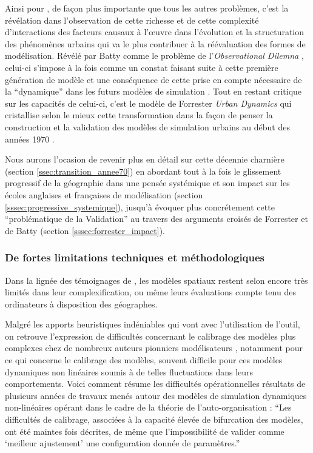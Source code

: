 Ainsi pour \textcite[11]{Batty1976}, de façon plus importante que tous les autres problèmes, c'est la révélation dans l'observation de cette richesse et de cette complexité d'interactions des facteurs causaux à l’œuvre dans l'évolution et la structuration des phénomènes urbains qui va le plus contribuer à la réévaluation des formes de modélisation. Révélé par Batty comme le problème de l'\textit{Observational Dilemna} \autocite[11,296]{Batty1976} , celui-ci s'impose à la fois comme un constat faisant suite à cette première génération de modèle  et une conséquence de cette prise en compte nécessaire de la \enquote{dynamique} dans les futurs modèles de simulation . Tout en restant critique sur les capacités de celui-ci, c'est le modèle de Forrester \textit{Urban Dynamics} \autocite{Forrester1969} qui cristallise selon \textcites{Batty2001, Batty2005b} le mieux cette transformation dans la façon de penser la construction et la validation des modèles de simulation urbains au début des années 1970 .

Nous aurons l'ocasion de revenir plus en détail sur cette décennie charnière (section \ref{ssec:transition_annee70}) en abordant tout à la fois le glissement progressif de la géographie dans une pensée systémique et son impact sur les écoles anglaises et françaises de modélisation (section \ref{sssec:progressive_systemique}), jusqu'à évoquer plus concrétement cette \enquote{problématique de la Validation} au travers des arguments croisés de Forrester et de Batty (section \ref{sssec:forrester_impact}).

\subsubsection{De fortes limitations techniques et méthodologiques}
\label{ssec:limitation_techniques_methodologiques}

Dans la lignée des témoignages de \textcite{Marble1972} , les modèles spatiaux restent selon \textcite{Batty1976}  encore très limités dans leur complexification, ou même leurs évaluations compte tenu des ordinateurs à disposition des géographes.

Malgré les apports heuristiques indéniables qui vont avec l'utilisation de l'outil, on retrouve l'expression de difficultés concernant le calibrage des modèles plus complexes chez de nombreux auteurs pionniers modélisateurs \autocites{Batty1976,Pumain1983b}[400]{Sanders1984}, notamment pour ce qui concerne le calibrage des modèles, souvent difficile pour ces modèles dynamiques non linéaires soumis à de telles fluctuations dans leurs comportements. Voici comment \autocite{Pumain1998a} résume les difficultés opérationnelles résultats de plusieurs années de travaux menés autour des modèles de simulation dynamiques non-linéaires opérant dans le cadre de la théorie de l'auto-organisation : \enquote{Les difficultés de calibrage, associées à la capacité élevée de bifurcation des modèles, ont été maintes fois décrites, de même que l’impossibilité de valider comme \enquote{meilleur ajustement} une configuration donnée de paramètres.}

